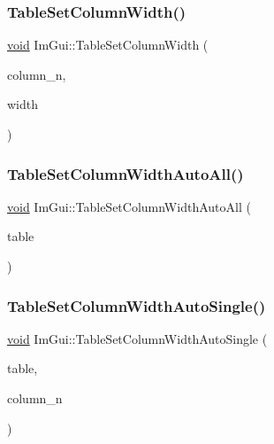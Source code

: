 \mbox{\label{namespaceImGui_a8f8f11d2ca0e94811ce10a7258283d38}} 
\subsubsection{\texorpdfstring{Table\+Set\+Column\+Width()}{TableSetColumnWidth()}}
{\footnotesize\ttfamily \hyperlink{imgui__impl__opengl3__loader_8h_ac668e7cffd9e2e9cfee428b9b2f34fa7}{void} Im\+Gui\+::\+Table\+Set\+Column\+Width (\begin{DoxyParamCaption}\item[{int}]{column\+\_\+n,  }\item[{float}]{width }\end{DoxyParamCaption})}

\mbox{\label{namespaceImGui_a772b157564e3624de66e0f86b0ed3f37}} 
\subsubsection{\texorpdfstring{Table\+Set\+Column\+Width\+Auto\+All()}{TableSetColumnWidthAutoAll()}}
{\footnotesize\ttfamily \hyperlink{imgui__impl__opengl3__loader_8h_ac668e7cffd9e2e9cfee428b9b2f34fa7}{void} Im\+Gui\+::\+Table\+Set\+Column\+Width\+Auto\+All (\begin{DoxyParamCaption}\item[{\hyperlink{structImGuiTable}{Im\+Gui\+Table} $\ast$}]{table }\end{DoxyParamCaption})}

\mbox{\label{namespaceImGui_a7db13485f1945070e9de98facafe7e1d}} 
\subsubsection{\texorpdfstring{Table\+Set\+Column\+Width\+Auto\+Single()}{TableSetColumnWidthAutoSingle()}}
{\footnotesize\ttfamily \hyperlink{imgui__impl__opengl3__loader_8h_ac668e7cffd9e2e9cfee428b9b2f34fa7}{void} Im\+Gui\+::\+Table\+Set\+Column\+Width\+Auto\+Single (\begin{DoxyParamCaption}\item[{\hyperlink{structImGuiTable}{Im\+Gui\+Table} $\ast$}]{table,  }\item[{int}]{column\+\_\+n }\end{DoxyParamCaption})}

